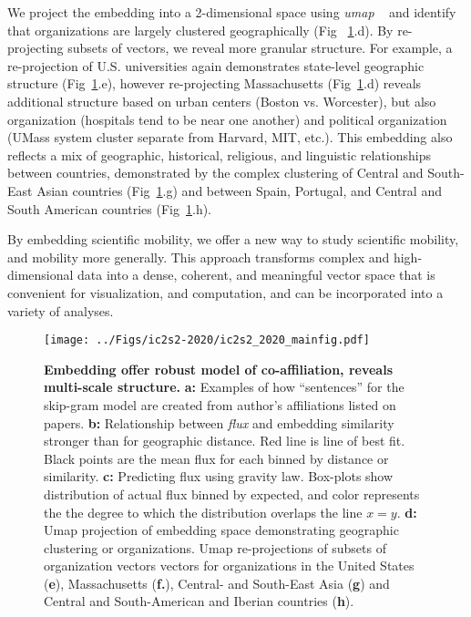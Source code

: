 \documentclass[a4paper,12pt]{article}
\begin{document}
We project the embedding into a 2-dimensional space using \textit{umap} ~\autocite{mcinnes_umap_2018} and identify that organizations are largely clustered geographically (Fig ~\ref{fig:image}.d). 
By re-projecting subsets of vectors, we reveal more granular structure.
For example, a re-projection of U.S. universities again demonstrates state-level geographic structure (Fig~\ref{fig:image}.e), however re-projecting Massachusetts (Fig~\ref{fig:image}.d) reveals additional structure based on urban centers (Boston vs. Worcester), but also organization (hospitals tend to be near one another) and political organization (UMass system cluster separate from Harvard, MIT, etc.).
This embedding also reflects a mix of geographic, historical, religious, and linguistic relationships between countries, demonstrated by the complex clustering of Central and South-East Asian countries (Fig~\ref{fig:image}.g) and between Spain, Portugal, and Central and South American countries (Fig~\ref{fig:image}.h). 

By embedding scientific mobility, we offer a new way to study scientific mobility, and mobility more generally. 
This approach transforms complex and high-dimensional data into a dense, coherent, and meaningful vector space that is convenient for visualization, and computation, and can be incorporated into a variety of analyses. 


\begin{figure}[ht!]
	\centering
	\texttt{[image: ../Figs/ic2s2-2020/ic2s2\_2020\_mainfig.pdf]}
	\caption{ 
	\textbf{Embedding offer robust model of co-affiliation, reveals multi-scale structure.}
	\textbf{a:} Examples of how ``sentences'' for the skip-gram model are created from author's affiliations listed on papers.
	\textbf{b:} Relationship between \textit{flux} and embedding similarity stronger than for geographic distance. 
	Red line is line of best fit.
	Black points are the mean flux for each binned by distance or similarity. 
	\textbf{c:} Predicting flux using gravity law.
	Box-plots show distribution of actual flux binned by expected, and color represents the the degree to which the distribution overlaps the line $x = y$. 
	\textbf{d:} Umap projection of embedding space demonstrating geographic clustering or organizations.
	Umap re-projections of subsets of organization vectors vectors for organizations in the United States (\textbf{e}), Massachusetts (\textbf{f.}), Central- and South-East Asia (\textbf{g}) and Central and South-American and Iberian countries (\textbf{h}). 
	 }
	\label{fig:image}
\end{figure}

%
%
%
\begingroup
{}
\small
\setlength\bibitemsep{1pt}
\printbibliography
\endgroup
\end{document}
